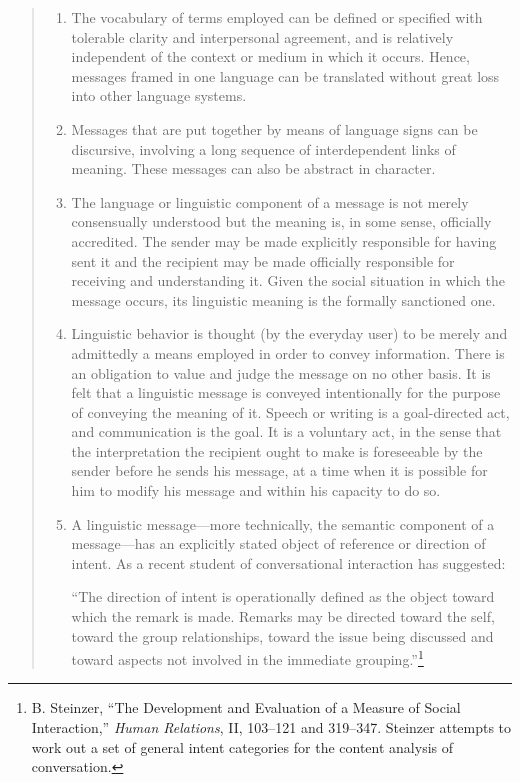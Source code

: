 \documentclass[openany,nobib]{tufte-book}
\begin{document}
\begin{quote}
\begin{enumerate}
\item
  The vocabulary of terms employed can be defined or specified with
  tolerable clarity and interpersonal agreement, and is relatively
  independent of the context or medium in which it occurs. Hence,
  messages framed in one language can be translated without great loss
  into other language systems.
\item
  Messages that are put together by means of language signs can be
  discursive, involving a long sequence of interdependent links of
  meaning. These messages can also be abstract in character.
\item
  The language or linguistic component of a message is not merely
  consensually understood but the meaning is, in some sense, officially
  accredited. The sender may be made explicitly responsible for having
  sent it and the recipient may be made officially responsible for
  receiving and understanding it. Given the social situation in which
  the message occurs, its linguistic meaning is the formally sanctioned
  one.
\item
  Linguistic behavior is thought (by the everyday user) to be merely and
  admittedly a means employed in order to convey information. There is
  an obligation to value and judge the message on no other basis. It is
  felt that a linguistic message is conveyed intentionally for the
  purpose of conveying the meaning of it. Speech or writing is a
  goal-directed act, and communication is the goal. It is a voluntary
  act, in the sense that the interpretation the recipient ought to make
  is foreseeable by the sender before he sends his message, at a time
  when it is possible for him to modify his message and within his
  capacity to do so.
\item
  A linguistic message---more technically, the semantic component of a
  message---has an explicitly stated object of reference or direction of
  intent. As a recent student of conversational interaction has
  suggested:

  ``The direction of intent is operationally defined as the object
  toward which the remark is made. Remarks may be directed toward the
  self, toward the group relationships, toward the issue being discussed
  and toward aspects not involved in the immediate
  grouping.''\footnote{B. Steinzer, ``The Development and Evaluation of
    a Measure of Social Interaction,'' \emph{Human Relations}, II,
    103--121 and 319--347. Steinzer attempts to work out a set of
    general intent categories for the content analysis of conversation.}


\end{enumerate}
\end{quote}
\end{document}

